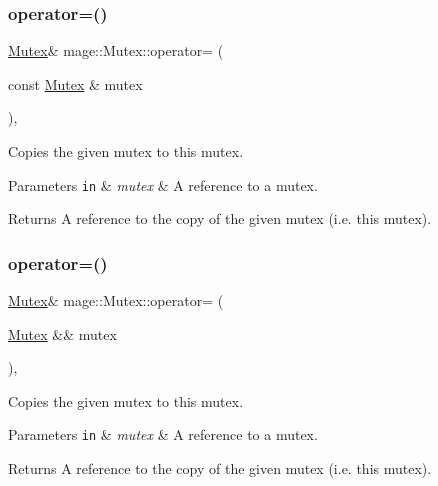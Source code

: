 \subsubsection{\texorpdfstring{operator=()}{operator=()}\hspace{0.1cm}{\footnotesize\ttfamily [1/2]}}
{\footnotesize\ttfamily \hyperlink{classmage_1_1_mutex}{Mutex}\& mage\+::\+Mutex\+::operator= (\begin{DoxyParamCaption}\item[{const \hyperlink{classmage_1_1_mutex}{Mutex} \&}]{mutex }\end{DoxyParamCaption})\hspace{0.3cm}{\ttfamily [private]}, {\ttfamily [delete]}}

Copies the given mutex to this mutex.


\begin{DoxyParams}[1]{Parameters}
\mbox{\tt in}  & {\em mutex} & A reference to a mutex. \\
\hline
\end{DoxyParams}
\begin{DoxyReturn}{Returns}
A reference to the copy of the given mutex (i.\+e. this mutex). 
\end{DoxyReturn}
\hypertarget{classmage_1_1_mutex_aaef0078f5b70afb0e5a290a5b5f33680}{}\label{classmage_1_1_mutex_aaef0078f5b70afb0e5a290a5b5f33680} 
\subsubsection{\texorpdfstring{operator=()}{operator=()}\hspace{0.1cm}{\footnotesize\ttfamily [2/2]}}
{\footnotesize\ttfamily \hyperlink{classmage_1_1_mutex}{Mutex}\& mage\+::\+Mutex\+::operator= (\begin{DoxyParamCaption}\item[{\hyperlink{classmage_1_1_mutex}{Mutex} \&\&}]{mutex }\end{DoxyParamCaption})\hspace{0.3cm}{\ttfamily [private]}, {\ttfamily [delete]}}

Copies the given mutex to this mutex.


\begin{DoxyParams}[1]{Parameters}
\mbox{\tt in}  & {\em mutex} & A reference to a mutex. \\
\hline
\end{DoxyParams}
\begin{DoxyReturn}{Returns}
A reference to the copy of the given mutex (i.\+e. this mutex). 
\end{DoxyReturn}


